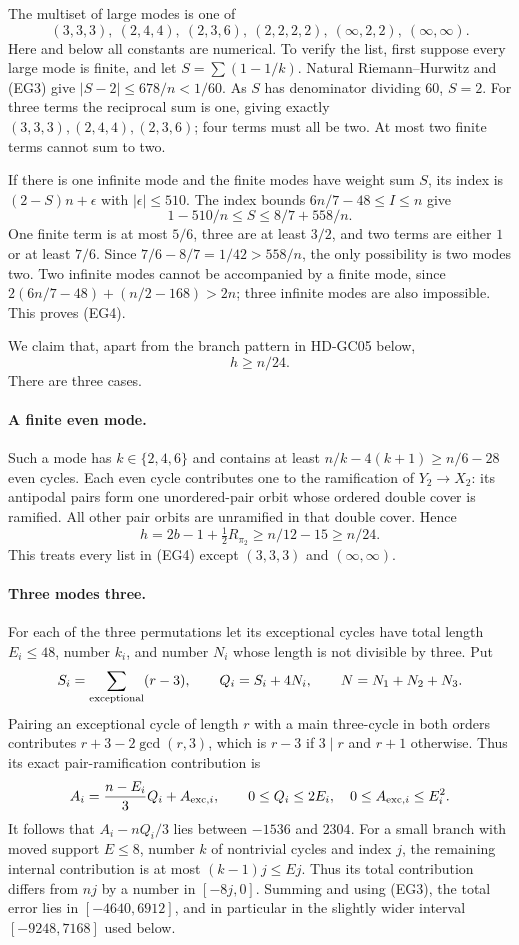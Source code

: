 The multiset of large modes is one of
\[
 (3,3,3),\ (2,4,4),\ (2,3,6),\ (2,2,2,2),\
 (\infty,2,2),\ (\infty,\infty).                    \tag{EG4}
\]
Here and below all constants are numerical. To verify the list, first
suppose every large mode is finite, and let
$S=\sum(1-1/k)$. Natural Riemann--Hurwitz and (EG3) give
$|S-2|\leq678/n<1/60$. As $S$ has denominator dividing $60$, $S=2$.
For three terms the reciprocal sum is one, giving exactly
$(3,3,3),(2,4,4),(2,3,6)$; four terms must all be two. At most two
finite terms cannot sum to two.

If there is one infinite mode and the finite modes have weight sum
$S$, its index is $(2-S)n+\epsilon$ with $|\epsilon|\leq510$.
The index bounds $6n/7-48\leq I\leq n$ give
\[
           1-510/n\leq S\leq8/7+558/n.
\]
One finite term is at most $5/6$, three are at least $3/2$,
and two terms are either $1$ or at least $7/6$.
Since $7/6-8/7=1/42>558/n$, the only possibility is two modes two.
Two infinite modes cannot be accompanied by a finite mode, since
$2(6n/7-48)+(n/2-168)>2n$; three infinite modes are also impossible.
This proves (EG4).

We claim that, apart from the branch pattern in HD-GC05 below,
\[
                              h\geq n/24.           \tag{EG5}
\]
There are three cases.

\paragraph{A finite even mode.}
Such a mode has $k\in\{2,4,6\}$ and contains at least
$n/k-4(k+1)\geq n/6-28$ even cycles. Each even cycle contributes
one to the ramification of $Y_2\to X_2$: its antipodal pairs form
one unordered-pair orbit whose ordered double cover is ramified.
All other pair orbits are unramified in that double cover. Hence
\[
       h=2b-1+\tfrac12R_{\pi_2}
          \geq n/12-15\geq n/24.                   \tag{EG6}
\]
This treats every list in (EG4) except $(3,3,3)$ and
$(\infty,\infty)$.

\paragraph{Three modes three.}
For each of the three permutations let its exceptional cycles have
total length $E_i\leq48$, number $k_i$, and number $N_i$ whose
length is not divisible by three. Put
\[
 S_i=\sum_{\rm exceptional}(r-3),\qquad
 Q_i=S_i+4N_i,
 \qquad N=N_1+N_2+N_3.
\]
Pairing an exceptional cycle of length $r$ with a main three-cycle
in both orders contributes $r+3-2\gcd(r,3)$, which is $r-3$ if
$3\mid r$ and $r+1$ otherwise. Thus its exact pair-ramification
contribution is
\[
 A_i=\frac{n-E_i}{3}Q_i+A_{{\rm exc},i},
 \qquad 0\leq Q_i\leq2E_i,\quad
 0\leq A_{{\rm exc},i}\leq E_i^2.
\]
It follows that $A_i-nQ_i/3$ lies between $-1536$ and $2304$.
For a small branch with moved support $E\leq8$, number $k$ of
nontrivial cycles and index $j$, the remaining internal contribution
is at most $(k-1)j\leq Ej$. Thus its total contribution differs
from $nj$ by a number in $[-8j,0]$. Summing and using (EG3),
the total error lies in $[-4640,6912]$, and in particular in the
slightly wider interval $[-9248,7168]$ used below.

